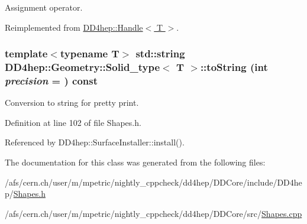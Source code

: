 Assignment operator. 

Reimplemented from \hyperlink{class_d_d4hep_1_1_handle_a9bbf8f498df42e81ad26fb00233505a6}{DD4hep::Handle$<$ T $>$}.\hypertarget{class_d_d4hep_1_1_geometry_1_1_solid__type_aee5f24edfb164e0443ed83af1f25a08e}{
\subsubsection[{toString}]{\setlength{\rightskip}{0pt plus 5cm}template$<$typename T$>$ std::string {\bf DD4hep::Geometry::Solid\_\-type}$<$ {\bf T} $>$::toString (int {\em precision} = {}) const}}
\label{class_d_d4hep_1_1_geometry_1_1_solid__type_aee5f24edfb164e0443ed83af1f25a08e}


Conversion to string for pretty print. 

Definition at line 102 of file Shapes.h.

Referenced by DD4hep::SurfaceInstaller::install().

The documentation for this class was generated from the following files:\begin{DoxyCompactItemize}
\item 
/afs/cern.ch/user/m/mpetric/nightly\_\-cppcheck/dd4hep/DDCore/include/DD4hep/\hyperlink{_shapes_8h}{Shapes.h}\item 
/afs/cern.ch/user/m/mpetric/nightly\_\-cppcheck/dd4hep/DDCore/src/\hyperlink{_shapes_8cpp}{Shapes.cpp}\end{DoxyCompactItemize}
